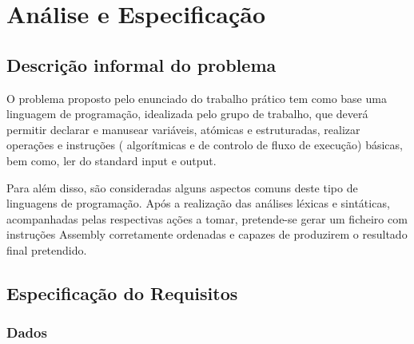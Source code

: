 \documentclass{report}
\begin{document}
\chapter{Análise e Especificação} \label{ae}
\section{Descrição informal do problema}

O problema proposto pelo enunciado do trabalho prático tem como base uma linguagem de programação, idealizada pelo grupo de trabalho, que deverá permitir declarar e manusear variáveis, atómicas e estruturadas, realizar operações e instruções ( algorítmicas e de controlo de fluxo de execução) básicas, bem como, ler do standard input e output.

Para além disso, são consideradas alguns aspectos comuns deste tipo de linguagens de programação. Após a realização das análises léxicas e sintáticas, acompanhadas pelas respectivas ações a tomar, pretende-se  gerar um ficheiro com instruções Assembly corretamente ordenadas e capazes de produzirem o resultado final pretendido.   
 
 
\section{Especificação do Requisitos}
\subsection{Dados}
\end{document}
